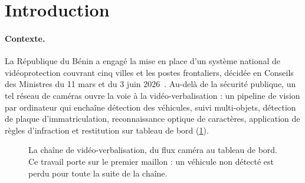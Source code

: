 \section{Introduction}\label{sec-intro}

\paragraph{Contexte.}
La République du Bénin a engagé la mise en place d'un système national
de vidéoprotection couvrant cinq villes et les postes
frontaliers, décidée en Conseils des Ministres du 11 mars et du 3 juin
2026~\cite{sgg2026conseil}. Au-delà de la sécurité publique, un tel
réseau de caméras ouvre la voie à la vidéo-verbalisation : un pipeline
de vision par ordinateur qui enchaîne détection des véhicules, suivi
multi-objets, détection de plaque d'immatriculation, reconnaissance
optique de caractères, application de règles d'infraction et restitution
sur tableau de bord (\cref{fig-pipeline}).

\begin{figure}[b]
  \centering
  \caption{La chaîne de vidéo-verbalisation, du flux caméra au tableau
  de bord. Ce travail porte sur le premier maillon : un véhicule non
  détecté est perdu pour toute la suite de la chaîne.}
  \label{fig-pipeline}
\end{figure}

